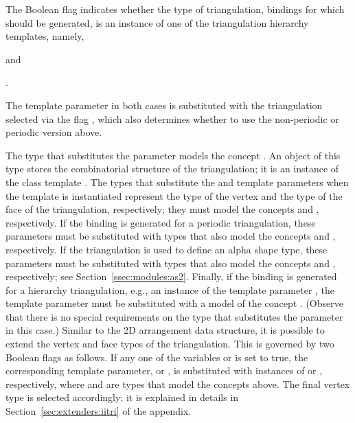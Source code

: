 The \cmake{} Boolean flag  indicates
whether the type of triangulation, bindings for which should be
generated, is an instance of one of the triangulation hierarchy
templates, namely,
\begin{compactitem}
\item {} and
\item {}.
\end{compactitem}
The template parameter in both cases is substituted with the
triangulation selected via the \cmake{} flag
, which also determines whether to use the
non-periodic or periodic version above.

The type that substitutes the  parameter models the
concept . An object of this
type stores the combinatorial structure of the triangulation; it is an
instance of the class template
.
The types that substitute the  and
 template parameters when the template
is instantiated represent the type of the vertex and the type of the
face of the triangulation, respectively; they must model the concepts
 and
, respectively. If the
binding is generated for a periodic triangulation, these parameters
must be substituted with types that also model the concepts
 and
, respectively.
If the triangulation is used to define an alpha shape type, these
parameters must be substituted with types that also model the concepts
 and
, respectively; see
Section~\ref{ssec:modules:as2}. Finally, if the binding is generated
for a hierarchy triangulation, e.g., an instance of the template
parameter ,
the  template parameter must be substituted with
a model of the concept
. (Observe that
there is no special requirements on the type that substitutes the
 parameter in this case.) Similar to the 2D
arrangement data structure, it is possible to extend the vertex and
face types of the triangulation. This is governed by two \cmake{}
Boolean flags as follows. If any one of the \cmake{} variables
 or
 is set to true, the
corresponding template parameter,  or ,
is substituted with instances of
or
,
respectively, where
 and  are types that model the concepts above.
The final vertex type is selected accordingly; it is explained in
details in Section~\ref{sec:extenders:iitri} of the appendix.

